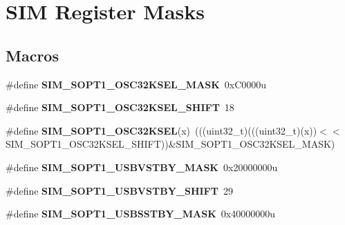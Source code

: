 \hypertarget{group___s_i_m___register___masks}{}\section{S\+IM Register Masks}
\label{group___s_i_m___register___masks}
\subsection*{Macros}
\begin{DoxyCompactItemize}
\item 
\mbox{\label{group___s_i_m___register___masks_ga5c660cd4a6d8062e6ef4afbc17c27fa4}} 
\#define {\bfseries S\+I\+M\+\_\+\+S\+O\+P\+T1\+\_\+\+O\+S\+C32\+K\+S\+E\+L\+\_\+\+M\+A\+SK}~0x\+C0000u
\item 
\mbox{\label{group___s_i_m___register___masks_gac9e930c4ee375a2aee6fa6c97e061226}} 
\#define {\bfseries S\+I\+M\+\_\+\+S\+O\+P\+T1\+\_\+\+O\+S\+C32\+K\+S\+E\+L\+\_\+\+S\+H\+I\+FT}~18
\item 
\mbox{\label{group___s_i_m___register___masks_gaf89520e7506a3dec707983ab729aef08}} 
\#define {\bfseries S\+I\+M\+\_\+\+S\+O\+P\+T1\+\_\+\+O\+S\+C32\+K\+S\+EL}(x)~(((uint32\+\_\+t)(((uint32\+\_\+t)(x))$<$$<$S\+I\+M\+\_\+\+S\+O\+P\+T1\+\_\+\+O\+S\+C32\+K\+S\+E\+L\+\_\+\+S\+H\+I\+FT))\&S\+I\+M\+\_\+\+S\+O\+P\+T1\+\_\+\+O\+S\+C32\+K\+S\+E\+L\+\_\+\+M\+A\+SK)
\item 
\mbox{\label{group___s_i_m___register___masks_gaaf0b406e4bd1800083f48727a7cde829}} 
\#define {\bfseries S\+I\+M\+\_\+\+S\+O\+P\+T1\+\_\+\+U\+S\+B\+V\+S\+T\+B\+Y\+\_\+\+M\+A\+SK}~0x20000000u
\item 
\mbox{\label{group___s_i_m___register___masks_gae945165e21faf14e58288bce0918482a}} 
\#define {\bfseries S\+I\+M\+\_\+\+S\+O\+P\+T1\+\_\+\+U\+S\+B\+V\+S\+T\+B\+Y\+\_\+\+S\+H\+I\+FT}~29
\item 
\mbox{\label{group___s_i_m___register___masks_ga93a808f7a1d75e26bc3ed565ab257617}} 
\#define {\bfseries S\+I\+M\+\_\+\+S\+O\+P\+T1\+\_\+\+U\+S\+B\+S\+S\+T\+B\+Y\+\_\+\+M\+A\+SK}~0x40000000u
$$
\end{DoxyCompactItemize}

